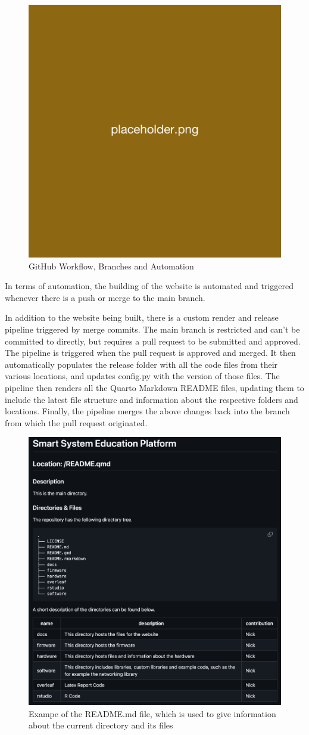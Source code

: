 \begin{figure}[H]
    \centering
    \includegraphics[width=0.5\linewidth]{overleaf/images/placeholder.png}
    \vspace{\ftspace}
    \caption{GitHub Workflow, Branches and Automation}
    \label{fig:enter-label}
\end{figure}

In terms of automation, the building of the website is automated and triggered whenever there is a push or merge to the main branch. 

In addition to the website being built, there is a custom render and release pipeline triggered by merge commits. The main branch is restricted and can't be committed to directly, but requires a pull request to be submitted and approved. The pipeline is triggered when the pull request is approved and merged. It then automatically populates the release folder with all the code files from their various locations, and updates config.py with the version of those files. The pipeline then renders all the Quarto Markdown README files, updating them to include the latest file structure and information about the respective folders and locations. Finally, the pipeline merges the above changes back into the branch from which the pull request originated.

\begin{figure}
    \centering
    \includegraphics[width=0.5\linewidth]{overleaf/images/readme.png}
    \vspace{\ftspace}
    \caption{Exampe of the README.md file, which is used to give information about the current directory and its files}
    \vspace{\ftspace}
    \label{fig:readme}
\end{figure}


